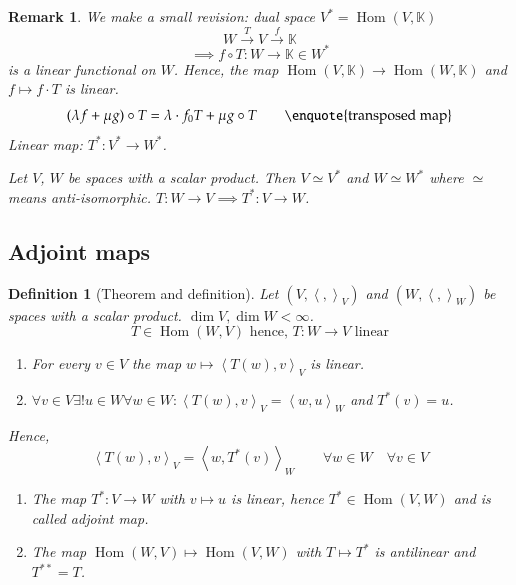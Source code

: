 \documentclass{article}
\newtheorem{definition}{Definition}  \numberwithin{definition}{section}
\newtheorem{remark}{Remark}  \numberwithin{remark}{section}
\newcommand{\ip}[2]{\left\langle#1,#2\right\rangle} %
\begin{document}
\begin{remark}
  We make a small revision: dual space $V^* = \operatorname{Hom}(V, \mathbb K)$
  \[ W \xrightarrow{T} V \xrightarrow{f} \mathbb K \]
  \[ \implies f \circ T: W \to \mathbb K \in W^* \]
  is a linear functional on $W$.
  Hence, the map $\operatorname{Hom}(V, \mathbb K) \to \operatorname{Hom}(W, \mathbb K)$ and $f \mapsto f \cdot T$ is linear.
  \[ (\lambda f + \mu g) \circ T = \lambda \cdot f_0 T + \mu g \circ T \qquad \text{\enquote{transposed map}} \]
  Linear map: $T^*: V^* \to W^*$.

  Let $V$, $W$ be spaces with a scalar product. Then $V \simeq V^*$ and $W \simeq W^*$ where $\simeq$ means anti-isomorphic.
  $T: W \to V \implies T^*: V \to W$.
\end{remark}

\subsection{Adjoint maps}
\begin{definition}[Theorem and definition] %
  \label{def863}
  Let $(V, \ip{}{}_V)$ and $(W, \ip{}{}_W)$ be spaces with a scalar product. $\dim{V}, \dim{W} < \infty$.
  \[ T \in \operatorname{Hom}(W, V) \text{ hence, } T: W \to V \text{ linear} \]
  \begin{enumerate}
    \item For every $v \in V$ the map $w \mapsto \ip{T(w)}{v}_V$ is linear.
    \item $\forall v \in V \exists! u \in W \forall w \in W: \ip{T(w)}{v}_V = \ip{w}{u}_W$ and $T^*(v) = u$.
  \end{enumerate}
  Hence,
  \[ \ip{T(w)}{v}_V = \ip{w}{T^*(v)}_W \qquad \forall w \in W \quad \forall v \in V \]
  \begin{enumerate}
    \item[3.] The map $T^*: V \to W$ with $v \mapsto u$ is linear, hence $T^* \in \operatorname{Hom}(V, W)$ and is called \emph{adjoint map}.
    \item[4.] The map $\operatorname{Hom}(W, V) \mapsto \operatorname{Hom}(V, W)$ with $T \mapsto T^*$ is antilinear and $T^{**} = T$.
  \end{enumerate}
\end{definition}
\end{document}
